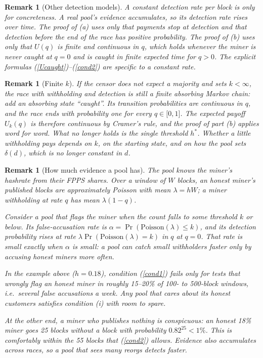 \documentclass{article}%
\newtheorem{remark}[theorem]{Remark}
\begin{document}
\begin{remark}[Other detection models\label{rem:otherdetection}]
A constant detection rate per block is only for concreteness. A real pool's
evidence accumulates, so its detection rate rises over time. The proof of (a)
uses only that payments stop at detection and that detection before the end
of the race has positive probability. The proof of (b) uses only that
$U(q)$ is finite and continuous in $q$, which holds whenever the miner is
never caught at $q=0$ and is caught in finite expected time for $q>0$. The
explicit formulas (\ref{Ucaught})--(\ref{cond2}) are specific to a constant
rate.
\end{remark}

\begin{remark}[Finite $k$]
If the censor does not expect a majority and sets $k<\infty$, the race with
withholding and detection is still a finite absorbing Markov chain: add an
absorbing state ``caught''. Its transition probabilities are continuous in
$q$, and the race ends with probability one for every $q\in\lbrack0,1]$. The
expected payoff $U_{k}(q)$ is therefore continuous by Cramer's rule, and the
proof of part (b) applies word for word. What no longer holds is the single
threshold $h^{\ast}$. Whether a little withholding pays depends on $k$, on the
starting state, and on how the pool sets $\delta(d)$, which is no longer
constant in $d$.
\end{remark}

\begin{remark}[How much evidence a pool has\label{rem:evidence}]
The pool knows the miner's hashrate from their FPPS shares. Over a window of
$W$ blocks, an honest miner's published blocks are approximately Poisson with
mean $\lambda=hW$; a miner withholding at rate $q$ has mean $\lambda(1-q)$.

Consider a pool that flags the miner when the count falls to some threshold
$k$ or below. Its false-accusation rate is $\alpha=\Pr(\text{Poisson}%
(\lambda)\leq k)$, and its detection probability rises at rate
$\lambda\Pr(\text{Poisson}(\lambda)=k)$ in $q$ at $q=0$. That rate is small
exactly when $\alpha$ is small: a pool can catch small withholders faster only
by accusing honest miners more often.

In the example above ($h=0.18$), condition (\ref{cond1}) fails only for tests
that wrongly flag an honest miner in roughly 15--20\% of 100- to 500-block
windows, i.e.\ several false accusations a week. Any pool that cares about its
honest customers satisfies condition (i) with room to spare.

At the other end, a miner who publishes nothing is conspicuous: an honest 18\%
miner goes 25 blocks without a block with probability $0.82^{25}<1\%$. This is
comfortably within the 55 blocks that (\ref{cond2}) allows. Evidence also
accumulates across races, so a pool that sees many reorgs detects faster.
\end{remark}

\end{document}
